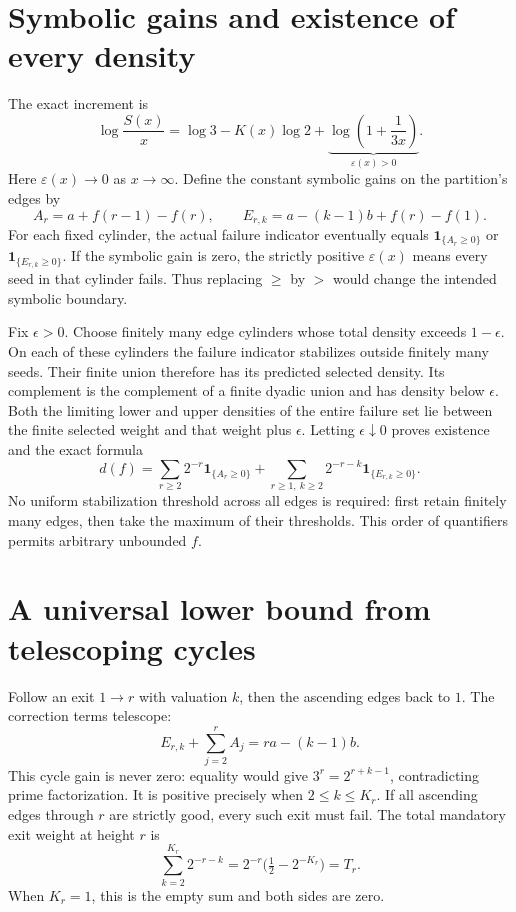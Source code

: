 \documentclass[11pt,letterpaper]{article}
\newcommand{\ind}{\mathbf{1}}
\begin{document}
\section{Symbolic gains and existence of every density}
The exact increment is
\[
 \log\frac{S(x)}x=\log3-K(x)\log2+
 \underbrace{\log\!\left(1+\frac1{3x}\right)}_{\varepsilon(x)>0}.
\]
Here $\varepsilon(x)\to0$ as $x\to\infty$. Define the constant symbolic gains
on the partition's edges by
\[
 A_r=a+f(r-1)-f(r),\qquad
 E_{r,k}=a-(k-1)b+f(r)-f(1).
\]
For each fixed cylinder, the actual failure indicator eventually equals
$\ind_{\{A_r\ge0\}}$ or $\ind_{\{E_{r,k}\ge0\}}$.
If the symbolic gain is zero, the strictly positive $\varepsilon(x)$ means
every seed in that cylinder fails. Thus replacing $\ge$ by $>$ would change
the intended symbolic boundary.

Fix $\epsilon>0$. Choose finitely many edge cylinders whose total density
exceeds $1-\epsilon$. On each of these cylinders the failure indicator
stabilizes outside finitely many seeds. Their finite union therefore has its
predicted selected density. Its complement is the complement of a finite
dyadic union and has density below $\epsilon$. Both the limiting lower and
upper densities of the entire failure set lie between the finite selected
weight and that weight plus $\epsilon$. Letting $\epsilon\downarrow0$ proves
existence and the exact formula
\begin{equation}\label{eq:density}
 d(f)=\sum_{r\ge2}2^{-r}\ind_{\{A_r\ge0\}}
 +\sum_{r\ge1,\ k\ge2}2^{-r-k}\ind_{\{E_{r,k}\ge0\}}.
\end{equation}
No uniform stabilization threshold across all edges is required: first retain
finitely many edges, then take the maximum of their thresholds. This order of
quantifiers permits arbitrary unbounded $f$.

\section{A universal lower bound from telescoping cycles}
Follow an exit $1\to r$ with valuation $k$, then the ascending edges back to
$1$. The correction terms telescope:
\begin{equation}\label{eq:cycle}
 E_{r,k}+\sum_{j=2}^{r}A_j=ra-(k-1)b.
\end{equation}
This cycle gain is never zero: equality would give
$3^r=2^{r+k-1}$, contradicting prime factorization. It is positive precisely
when $2\le k\le K_r$. If all ascending edges through $r$ are strictly good,
every such exit must fail. The total mandatory exit weight at height $r$ is
\[
 \sum_{k=2}^{K_r}2^{-r-k}
 =2^{-r}\bigl(\tfrac12-2^{-K_r}\bigr)=T_r.
\]
When $K_r=1$, this is the empty sum and both sides are zero.
\end{document}
